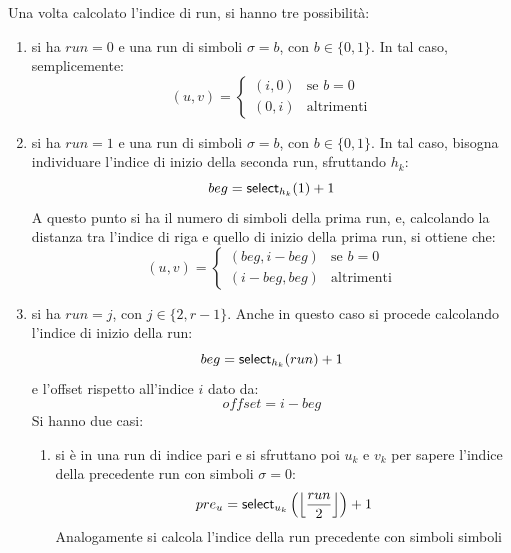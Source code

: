 Una volta calcolato l'indice di run, si hanno tre possibilità:
\begin{enumerate}
  \item si ha $run=0$ e una run di simboli $\sigma=b$, con $b\in\{0,1\}$. 
  In tal caso, semplicemente:
  \begin{equation}
    \label{eq:bv8}
    (u,v)=
    \begin{cases}
      (i,0)&\mbox{se } b=0\\
      (0,i)&\mbox{altrimenti}
    \end{cases}
  \end{equation}
  \item si ha $run=1$ e una run di simboli $\sigma=b$, con $b\in\{0,1\}$. In
  tal caso, bisogna individuare l'indice di inizio della seconda
  run, sfruttando $h_k$:
  \begin{equation}
    \label{eq:bv9}
    beg = \mbox{\rm {\sf select}}_{h_k}(1)+1
  \end{equation}
  A questo punto si ha il numero di simboli della prima run, e,
  calcolando la distanza tra l'indice di riga e quello di inizio della prima
  run, si ottiene che:
  \begin{equation}
    \label{eq:bv10}
    (u,v)=
    \begin{cases}
      (beg,i-beg)&\mbox{se } b=0\\
      (i-beg,beg)&\mbox{altrimenti}
    \end{cases}
  \end{equation}
  \item si ha $run=j$, con $j\in\{2,r-1\}$. Anche in questo caso si procede
  calcolando l'indice di inizio della run:
  \begin{equation}
    \label{eq:bv11}
    beg = \mbox{\rm {\sf select}}_{h_k}(run)+1
  \end{equation}
  e l'offset rispetto all'indice $i$ dato da:
  \begin{equation}
    \label{eq:bv12}
    offset = i-beg
  \end{equation}
  Si hanno due casi: 
  \begin{enumerate}
    \item si è in una run di indice pari e si sfruttano poi $u_k$ e $v_k$ per
    sapere l'indice della precedente run con 
    simboli $\sigma=0$:
    \begin{equation}
      \label{eq:bv13}
      pre_u=\mbox{\rm {\sf select}}_{u_k}\left(\left\lfloor\frac{run}{2}\right\rfloor\right)+1
    \end{equation}
    Analogamente si calcola l'indice della run precedente con simboli simboli

\end{enumerate}
\end{enumerate}
